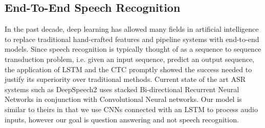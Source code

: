 \documentclass[letterpaper]{article} %
\begin{document}
\subsection{End-To-End Speech Recognition}
In the past decade, deep learning has allowed many fields in artificial intelligence to replace traditional hand-crafted features and pipeline systems with end-to-end models. Since speech recognition is typically thought of as a sequence to sequence transduction problem, i.e. given an input sequence, predict an output sequence, the application of LSTM and the CTC \cite{rnn:discrimspotting,ctc} promptly showed the success needed to justify its superiority over traditional methods. Current state of the art ASR systems such as DeepSpeech2 \cite{deepspeech2} uses stacked Bi-directional Recurrent Neural Networks in conjunction with Convolutional Neural networks. Our model is similar to theirs in that we use CNNs connected with an LSTM to process audio inputs, however our goal is question answering and not speech recognition.
\end{document}
